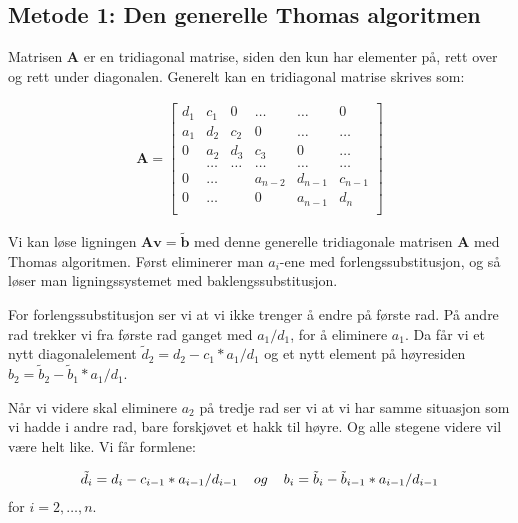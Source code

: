 \documentclass[reprint,english,notitlepage]{revtex4-1}
\begin{document}
\subsection{Metode 1: Den generelle Thomas algoritmen}
	Matrisen $\mathbf{A}$ er en tridiagonal matrise, siden den kun har elementer på, rett over og rett under diagonalen. Generelt kan en tridiagonal matrise skrives som:
	
	\begin{equation*}
	\begin{aligned}
	\mathbf{A} = \begin{bmatrix}
	d_1 & c_1 & 0 &\dots   & \dots &0 \\
	a_1 & d_2 & c_2 &0 &\dots &\dots \\
	0& a_2 & d_3 & c_3 & 0 & \dots \\
	& \dots   & \dots &\dots   &\dots & \dots \\
	0&\dots   &  &a_{n-2} & d_{n-1} & c_{n-1} \\
	0&\dots    &  & 0  &a_{n-1} & d_n \\
	\end{bmatrix}
	\end{aligned}
	\end{equation*}
	
	Vi kan løse ligningen $\mathbf{A}\mathbf{v} = \tilde{\mathbf{b}}$ med denne generelle tridiagonale matrisen $\mathbf{A}$ med Thomas algoritmen. Først eliminerer man $a_i$-ene med forlengssubstitusjon, og så løser man ligningssystemet med baklengssubstitusjon.
	
	For forlengssubstitusjon ser vi at vi ikke trenger å endre på første rad. På andre rad trekker vi fra første rad ganget med $a_1/d_1$, for å eliminere $a_1$. Da får vi et nytt diagonalelement $\tilde{d}_2 = d_2 - c_1 * a_1/d_1$ og et nytt element på høyresiden $b_2 = \tilde{b}_2 - \tilde{b}_1 * a_1/d_1$.
	
	Når vi videre skal eliminere $a_2$ på tredje rad ser vi at vi har samme situasjon som vi hadde i andre rad, bare forskjøvet et hakk til høyre. Og alle stegene videre vil være helt like. Vi får formlene:
	
	\begin{equation*}
	\begin{aligned}
	\tilde{d}_i = d_i - c_{i-1} * a_{i-1}/d_{i-1} \hspace{0.4cm} og \hspace{0.4cm} b_i = \tilde{b}_i - \tilde{b}_{i-1} * a_{i-1}/d_{i-1}
	\end{aligned}
	\end{equation*}
	for $i=2,\dots, n$.
	
\end{document}

